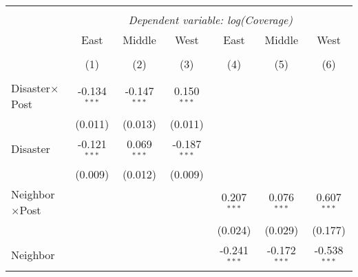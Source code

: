 
\begin{tabular}{@{\extracolsep{5pt}}lcccccc}
    \\[-1.8ex]\hline
    \hline                                                                                                                                                                                       \\[-1.8ex]
                        & \multicolumn{6}{c}{\textit{Dependent variable: log(Coverage)}} \
    \cr \cline{2-7}
    \\[-1.8ex] & \multicolumn{1}{c}{East} & \multicolumn{1}{c}{Middle} & \multicolumn{1}{c}{West} & \multicolumn{1}{c}{East} & \multicolumn{1}{c}{Middle} & \multicolumn{1}{c}{West}  \\
    \\[-1.8ex] & (1) & (2) & (3) & (4) & (5) & (6) \\
    \hline                                                                                                                                                                                       \\[-1.8ex]
    Disaster$\times$Post       & -0.134$^{***}$                                                       & -0.147$^{***}$   & 0.150$^{***}$     &                   &                  &                   \\
                        & (0.011)                                                              & (0.013)          & (0.011)           &                   &                  &                   \\
    Disaster            & -0.121$^{***}$                                                       & 0.069$^{***}$    & -0.187$^{***}$    &                   &                  &                   \\
                        & (0.009)                                                              & (0.012)          & (0.009)           &                   &                  &                   \\
    Neighbor$\times$Post       &                                                                      &                  &                   & 0.207$^{***}$     & 0.076$^{***}$    & 0.607$^{***}$     \\
                        &                                                                      &                  &                   & (0.024)           & (0.029)          & (0.177)           \\
    Neighbor            &                                                                      &                  &                   & -0.241$^{***}$    & -0.172$^{***}$   & -0.538$^{***}$    \\

\end{tabular}
